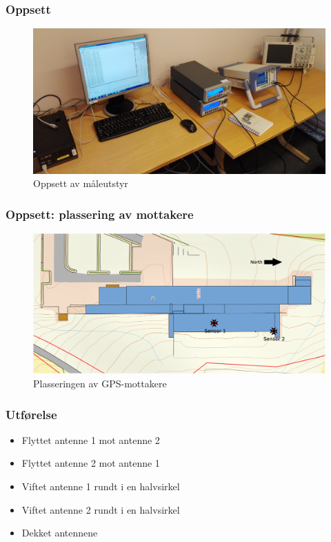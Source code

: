 \documentclass[xcolor=table]{beamer}
\begin{document}
\begin{frame}
\frametitle{Oppsett}
      \begin{figure}
        \includegraphics[scale=0.08]{thesis/graphics/lab_setup_cropped.jpg}
        \caption{Oppsett av måleutstyr}
      \end{figure}
\end{frame}

\begin{frame}
\frametitle{Oppsett: plassering av mottakere}
      \begin{figure}
        \includegraphics[scale=0.18]{thesis/graphics/roof.eps}
        \caption{Plasseringen av GPS-mottakere}
      \end{figure}
\end{frame}

\begin{frame}
\frametitle{Utførelse}
      \begin{itemize}
            \setlength\itemsep{2em}
        \item Flyttet antenne 1 mot antenne 2
        \item Flyttet antenne 2 mot antenne 1
        \item Viftet antenne 1 rundt i en halvsirkel
        \item Viftet antenne 2 rundt i en halvsirkel
        \item Dekket antennene
      \end{itemize}
\end{frame}
\end{document}
